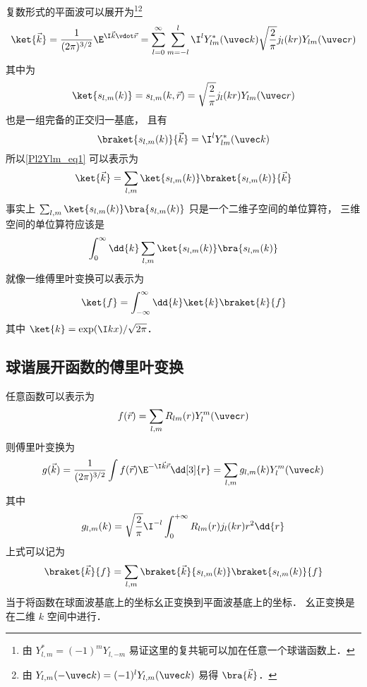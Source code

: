 

复数形式的平面波可以展开为\footnote{由 $Y_{l,m}^* = (-1)^m Y_{l,-m}$ 易证这里的复共轭可以加在任意一个球谐函数上．}\footnote{由 $Y_{l,m}(-\uvec k) = (-1)^l Y_{l,m}(\uvec k)$ 易得 $\bra{\vec k}$．}
\begin{equation}\label{Pl2Ylm_eq1}
\ket{\vec k} = \frac{1}{(2\pi)^{3/2}}\E^{\I \vec k \vdot \vec r} = \sum_{l=0}^{\infty} \sum_{m=-l}^l \I^l Y_{lm}^*(\uvec k) \sqrt{\frac{2}{\pi}} j_l(kr) Y_{lm}(\uvec r)
\end{equation}
其中为
\begin{equation}
\ket{s_{l,m}(k)} = s_{l,m}(k,\vec r) = \sqrt{\frac{2}{\pi}} j_l(kr) Y_{lm}(\uvec r)
\end{equation}
也是一组完备的正交归一基底， 且有
\begin{equation}
\braket{s_{l,m}(k)}{\vec k} = \I^l Y_{lm}^*(\uvec k)
\end{equation}
所以\autoref{Pl2Ylm_eq1} 可以表示为
\begin{equation}
\ket{\vec k} = \sum_{l,m}\ket{s_{l,m}(k)}\braket{s_{l,m}(k)}{\vec k} 
\end{equation}
事实上 $\sum_{l,m} \ket{s_{l,m}(k)}\bra{s_{l,m}(k)}$ 只是一个二维子空间的单位算符， 三维空间的单位算符应该是
\begin{equation}
\int_0^\infty \dd{k} \sum_{l,m} \ket{s_{l,m}(k)}\bra{s_{l,m}(k)}
\end{equation}
就像一维傅里叶变换可以表示为%
\begin{equation}
\ket{f} = \int_{-\infty}^{\infty} \dd{k} \ket{k}\braket{k}{f}
\end{equation}
其中 $\ket{k} = \exp(\I kx)/\sqrt{2\pi}$．

\subsection{球谐展开函数的傅里叶变换}

任意函数可以表示为
\begin{equation}
f(\vec r) = \sum_{l,m} R_{lm}(r) Y_l^m(\uvec r)
\end{equation}
则傅里叶变换为
\begin{equation}
g(\vec k) = \frac{1}{(2\pi)^{3/2}} \int f(\vec r) \E^{-\I \vec k \vec r} \dd[3]{r}
=  \sum_{l,m} g_{l,m}(k)  Y_l^m(\uvec k) 
\end{equation}
其中
\begin{equation}
g_{l,m}(k) = \sqrt{\frac{2}{\pi}} \I^{-l} \int_0^{+\infty} R_{lm}(r) j_l(kr) r^2 \dd{r}
\end{equation}
上式可以记为
\begin{equation}
\braket{\vec k}{f} = \sum_{l,m} \braket{\vec k}{s_{l,m}(k)}\braket{s_{l,m}(k)}{f}
\end{equation}
当于将函数在球面波基底上的坐标幺正变换到平面波基底上的坐标． 幺正变换是在二维 $k$ 空间中进行．

